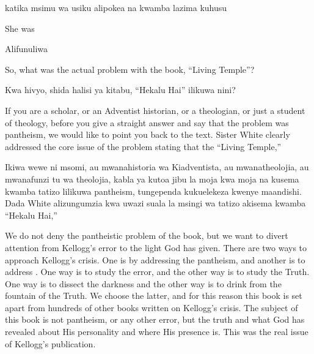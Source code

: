  katika msimu wa usiku alipokea  na kwamba lazima  kuhusu 


She was 


Alifunuliwa 


So, what was the actual problem with the book, “Living Temple”?


Kwa hivyo, shida halisi ya kitabu, “Hekalu Hai” ilikuwa nini?


If you are a scholar, or an Adventist historian, or a theologian, or just a student of theology, before you give a straight answer and say that the problem was pantheism, we would like to point you back to the text. Sister White clearly addressed the core issue of the problem stating that the “Living Temple,” 


Ikiwa wewe ni msomi, au mwanahistoria wa Kiadventista, au mwanatheolojia, au mwanafunzi tu wa theolojia, kabla ya kutoa jibu la moja kwa moja na kusema kwamba tatizo lilikuwa pantheism, tungependa kukuelekeza kwenye maandishi. Dada White alizungumzia kwa uwazi suala la msingi wa tatizo akisema kwamba “Hekalu Hai,” 


We do not deny the pantheistic problem of the book, but we want to divert attention from Kellogg’s error to the light God has given. There are two ways to approach Kellogg’s crisis. One is by addressing the pantheism, and another is to address . One way is to study the error, and the other way is to study the Truth. One way is to dissect the darkness and the other way is to drink from the fountain of the Truth. We choose the latter, and for this reason this book is set apart from hundreds of other books written on Kellogg’s crisis. The subject of this book is not pantheism, or any other error, but the truth and what God has revealed about His personality and where His presence is. This was the real issue of Kellogg’s publication.


